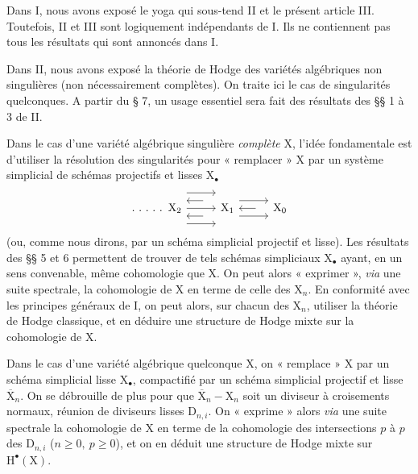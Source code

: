 \documentclass[11pt,leqno]{article}
\begin{document}
Dans I, nous avons exposé le yoga qui sous-tend II et le présent article III. Toutefois, II et III sont logiquement indépendants de I. Ils ne contiennent pas tous les résultats qui sont annoncés dans I.

Dans II, nous avons exposé la théorie de Hodge des variétés algébriques non singulières (non nécessairement complètes). On traite ici le cas de singularités quelconques. A partir du § 7, un usage essentiel sera fait des résultats des §§ 1 à 3 de II.

Dans le cas d’une variété algébrique singulière \textit{complète} \(\mathrm{X}\), l’idée fondamentale est d’utiliser la résolution des singularités pour « remplacer » \(\mathrm{X}\) par un système simplicial de schémas projectifs et lisses \(\mathrm{X}_{\bullet}\)
\[
\begin{tikzcd}[column sep=2.6em]
\ldotp\,\ldotp\,\ldotp\,\ldotp\,\ldotp\ \mathrm{X}_2
  \arrow[r, shift left=3.2ex]
  \arrow[r]
  \arrow[r, shift right=3.2ex]
&
\mathrm{X}_1
  \arrow[l, shift right=1.6ex, shorten <=1.1em]
  \arrow[l, shift left=1.6ex, shorten <=1.1em]
  \arrow[r, shift left=1.6ex]
  \arrow[r, shift right=1.6ex]
&
\mathrm{X}_0
  \arrow[l, shorten <=1.1em]
\end{tikzcd}
\]
(ou, comme nous dirons, par un schéma simplicial projectif et lisse). Les résultats des §§ 5 et 6 permettent de trouver de tels schémas simpliciaux \(\mathrm{X}_{\bullet}\) ayant, en un sens convenable, même cohomologie que \(\mathrm{X}\). On peut alors « exprimer », \textit{via} une suite spectrale, la cohomologie de \(\mathrm{X}\) en terme de celle des \(\mathrm{X}_n\). En conformité avec les principes généraux de I, on peut alors, sur chacun des \(\mathrm{X}_n\), utiliser la théorie de Hodge classique, et en déduire une structure de Hodge mixte sur la cohomologie de \(\mathrm{X}\).

Dans le cas d’une variété algébrique quelconque \(\mathrm{X}\), on « remplace » \(\mathrm{X}\) par un schéma simplicial lisse \(\mathrm{X}_{\bullet}\), compactifié par un schéma simplicial projectif et lisse \(\overline{\mathrm{X}}_n\). On se débrouille de plus pour que \(\overline{\mathrm{X}}_n-\mathrm{X}_n\) soit un diviseur à croisements normaux, réunion de diviseurs lisses \(\mathrm{D}_{n,i}\). On « exprime » alors \textit{via} une suite spectrale la cohomologie de \(\mathrm{X}\) en terme de la cohomologie des intersections \(p\) à \(p\) des \(\mathrm{D}_{n,i}\) (\(n\geq 0,\ p\geq 0\)), et on en déduit une structure de Hodge mixte sur \(\mathrm{H}^{\bullet}(\mathrm{X})\).
\end{document}
